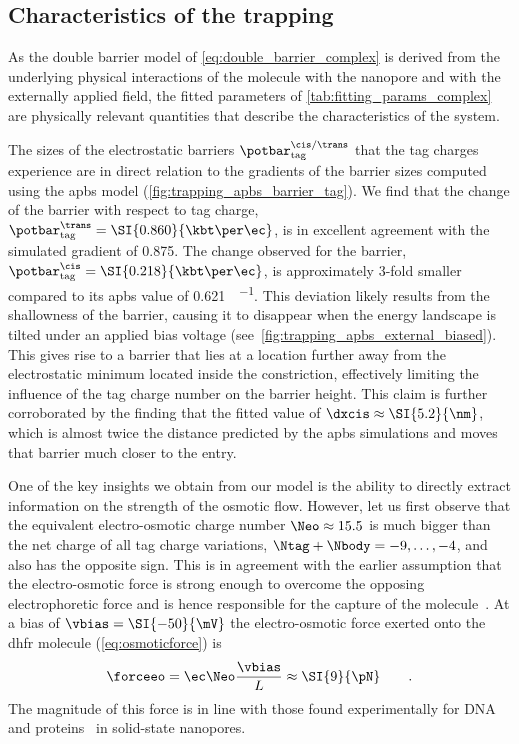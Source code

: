 \subsection{Characteristics of the trapping}
%

As the double barrier model of \cref{eq:double_barrier_complex} is derived from the underlying physical
interactions of the molecule with the nanopore and with the externally applied field, the fitted parameters of
\cref{tab:fitting_params_complex} are physically relevant quantities that describe the characteristics of the
system.

The sizes of the electrostatic barriers $\potbar_{\rm{tag}}^{\cis/\trans}$ that the tag charges experience are
in direct relation to the gradients of the barrier sizes computed using the \gls{apbs} model
(\cref{fig:trapping_apbs_barrier_tag}). We find that the change of the \transi{} barrier with respect to tag
charge, $\potbar_{\rm{tag}}^{\trans} = \text{\SI{0.860}{\kbt\per\ec}}$, is in excellent agreement with the
simulated gradient of \SI{0.875}{\Vt}. The change observed for the \cisi{} barrier, $\potbar_{\rm tag}^{\cis}
= \text{\SI{0.218}{\kbt\per\ec}}$, is approximately 3-fold smaller compared to its \gls{apbs} value of
\SI{0.621}{\kbt\per\ec}. This deviation likely results from the shallowness of the \cisi{} barrier, causing it
to disappear when the energy landscape is tilted under an applied bias voltage
(see~\cref{fig:trapping_apbs_external_biased}). This gives rise to a \cisi{} barrier that lies at a location
further away from the electrostatic minimum located inside the \transi{} constriction, effectively limiting
the influence of the tag charge number on the barrier height. This claim is further corroborated by the
finding that the fitted value of $\dxcis \approx \SI{5.2}{\nm}$, which is almost twice the distance predicted
by the \gls{apbs} simulations and moves that \cisi{} barrier much closer to the \cisi{} entry.

One of the key insights we obtain from our model is the ability to directly extract information on the
strength of the osmotic flow. However, let us first observe that the equivalent electro-osmotic charge number
$\Neo\approx15.5$ is much bigger than the net charge of all tag charge variations, $\Ntag + \Nbody = -
9,\ldots, -4$, and also has the opposite sign. This is in agreement with the earlier assumption that the
electro-osmotic force is strong enough to overcome the opposing electrophoretic force and is hence responsible
for the capture of the molecule~\cite{Soskine-2012,Soskine-Biesemans-2015}. At a bias of $\vbias =
\SI{-50}{\mV}$ the electro-osmotic force exerted onto the \gls{dhfr} molecule (\cref{eq:osmoticforce}) is
%
\begin{equation}
  \forceeo = \ec \Neo \frac{\vbias}{L} \approx \SI{9}{\pN}
  \qquad\text{.}
\end{equation}
%
The magnitude of this force is in line with those found experimentally for
DNA~\cite{Keyser-2006,vanDorp-2009,Lu-2012} and proteins~\cite{Oukhaled-2011} in solid-state nanopores.

